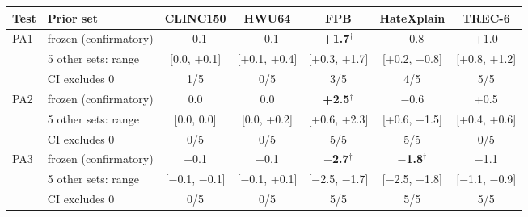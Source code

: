\begin{tabular}{llccccc}
\toprule
Test & Prior set & CLINC150 & HWU64 & FPB & HateXplain & TREC-6 \\
\midrule
PA1 & frozen (confirmatory) & +0.1 & +0.1 & \textbf{+1.7}$^\dagger$ & $-$0.8 & +1.0 \\
 & 5 other sets: range & [0.0, +0.1] & [+0.1, +0.4] & [+0.3, +1.7] & [+0.2, +0.8] & [+0.8, +1.2] \\
 & CI excludes 0 & 1/5 & 0/5 & 3/5 & 4/5 & 5/5 \\
\midrule
PA2 & frozen (confirmatory) & 0.0 & 0.0 & \textbf{+2.5}$^\dagger$ & $-$0.6 & +0.5 \\
 & 5 other sets: range & [0.0, 0.0] & [0.0, +0.2] & [+0.6, +2.3] & [+0.6, +1.5] & [+0.4, +0.6] \\
 & CI excludes 0 & 0/5 & 0/5 & 5/5 & 5/5 & 0/5 \\
\midrule
PA3 & frozen (confirmatory) & $-$0.1 & +0.1 & \textbf{$-$2.7}$^\dagger$ & \textbf{$-$1.8}$^\dagger$ & $-$1.1 \\
 & 5 other sets: range & [$-$0.1, $-$0.1] & [$-$0.1, +0.1] & [$-$2.5, $-$1.7] & [$-$2.5, $-$1.8] & [$-$1.1, $-$0.9] \\
 & CI excludes 0 & 0/5 & 0/5 & 5/5 & 5/5 & 5/5 \\
\bottomrule
\end{tabular}
